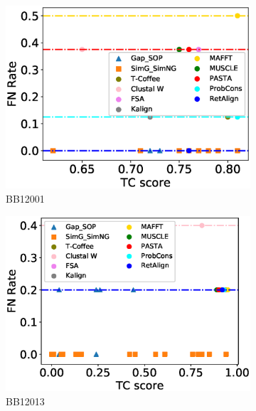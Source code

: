 \begin{figure}[!htbp]
	\centering
	\begin{adjustwidth}{-1.5cm}{-1cm}
		\begin{subfigure}{0.22\textwidth}
			\includegraphics[width=\columnwidth]{Figure/summary/precomputedInit/Balibase/BB12001_fnrate_vs_tc_2}
			\caption{BB12001}
		\end{subfigure}	
		\begin{subfigure}{0.22\textwidth}
			\includegraphics[width=\columnwidth]{Figure/summary/precomputedInit/Balibase/BB12013_fnrate_vs_tc_2}
			\caption{BB12013}
		\end{subfigure}
		\begin{subfigure}{0.22\textwidth}

\end{subfigure}
\end{adjustwidth}
\end{figure}
